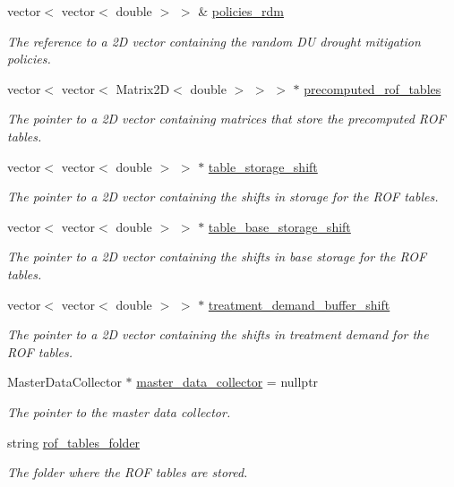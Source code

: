 \begin{DoxyCompactItemize}
vector$<$ vector$<$ double $>$ $>$ \& \mbox{\hyperlink{classSimulation_a4fd8d11506b6427577c9d8aa43932b2c}{policies\+\_\+rdm}}
\begin{DoxyCompactList}\small\item\em The reference to a 2D vector containing the random DU drought mitigation policies. \end{DoxyCompactList}\item 
vector$<$ vector$<$ Matrix2D$<$ double $>$ $>$ $>$ $\ast$ \mbox{\hyperlink{classSimulation_a7fc97bea88fee3f551d22042ae813428}{precomputed\+\_\+rof\+\_\+tables}}
\begin{DoxyCompactList}\small\item\em The pointer to a 2D vector containing matrices that store the precomputed R\+OF tables. \end{DoxyCompactList}\item 
vector$<$ vector$<$ double $>$ $>$ $\ast$ \mbox{\hyperlink{classSimulation_a024cbe4c66a4329c5f12009434b8bdc2}{table\+\_\+storage\+\_\+shift}}
\begin{DoxyCompactList}\small\item\em The pointer to a 2D vector containing the shifts in storage for the R\+OF tables. \end{DoxyCompactList}\item 
vector$<$ vector$<$ double $>$ $>$ $\ast$ \mbox{\hyperlink{classSimulation_ad2d6987ec81948619b26f7b687bb03cf}{table\+\_\+base\+\_\+storage\+\_\+shift}}
\begin{DoxyCompactList}\small\item\em The pointer to a 2D vector containing the shifts in base storage for the R\+OF tables. \end{DoxyCompactList}\item 
vector$<$ vector$<$ double $>$ $>$ $\ast$ \mbox{\hyperlink{classSimulation_acc283f08e6d30c3221676eccc555cc7b}{treatment\+\_\+demand\+\_\+buffer\+\_\+shift}}
\begin{DoxyCompactList}\small\item\em The pointer to a 2D vector containing the shifts in treatment demand for the R\+OF tables. \end{DoxyCompactList}\item 
Master\+Data\+Collector $\ast$ \mbox{\hyperlink{classSimulation_a9c69464c2674176a43d1d48bee9fad50}{master\+\_\+data\+\_\+collector}} = nullptr
\begin{DoxyCompactList}\small\item\em The pointer to the master data collector. \end{DoxyCompactList}\item 
string \mbox{\hyperlink{classSimulation_aca810eb7785417158d897dfdf366e9fa}{rof\+\_\+tables\+\_\+folder}}
\begin{DoxyCompactList}\small\item\em The folder where the R\+OF tables are stored. \end{DoxyCompactList}\end{DoxyCompactItemize}


